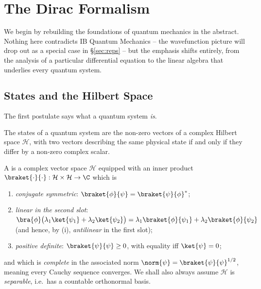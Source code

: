 \section{The Dirac Formalism}

We begin by rebuilding the foundations of quantum mechanics in the abstract. Nothing here contradicts IB Quantum Mechanics -- the wavefunction picture will drop out as a special case in \S\ref{sec:reps} -- but the emphasis shifts entirely, from the analysis of a particular differential equation to the linear algebra that underlies every quantum system.

\subsection{States and the Hilbert Space}

The first postulate says what a quantum system \emph{is}.

\begin{axiom}[States]
    The states of a quantum system are the non-zero vectors of a complex Hilbert space $\mathcal{H}$, with two vectors describing the same physical state if and only if they differ by a non-zero complex scalar.
\end{axiom}

A  is a complex vector space $\mathcal{H}$ equipped with an inner product $\braket{\cdot}{\cdot} : \mathcal{H} \times \mathcal{H} \to \C$ which is
\begin{enumerate}[label=(\roman*)]
    \item \emph{conjugate symmetric}: $\braket{\phi}{\psi} = \braket{\psi}{\phi}^*$;
    \item \emph{linear in the second slot}: $\bra{\phi}\big(\lambda_1 \ket{\psi_1} + \lambda_2 \ket{\psi_2}\big) = \lambda_1 \braket{\phi}{\psi_1} + \lambda_2\braket{\phi}{\psi_2}$ (and hence, by (i), \emph{antilinear} in the first slot);
    \item \emph{positive definite}: $\braket{\psi}{\psi} \geq 0$, with equality iff $\ket{\psi} = 0$;
\end{enumerate}
and which is \emph{complete} in the associated norm $\norm{\psi} = \braket{\psi}{\psi}^{1/2}$, meaning every Cauchy sequence converges. We shall also always assume $\mathcal{H}$ is \emph{separable}, i.e.\ has a countable orthonormal basis.

